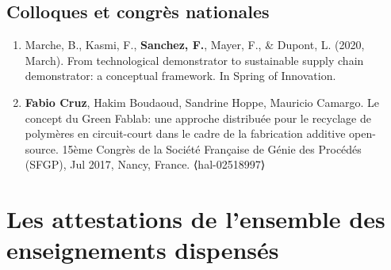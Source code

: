 \documentclass[
  12pt,
  oneside]{book}
\begin{document}
\hypertarget{colloques-et-congruxe8s-nationales}{%
\subsection{Colloques et congrès nationales}\label{colloques-et-congruxe8s-nationales}}

\begin{enumerate}
\def\labelenumi{\arabic{enumi}.}
\item
  Marche, B., Kasmi, F., \textbf{Sanchez, F.}, Mayer, F., \& Dupont, L. (2020, March). From technological demonstrator to sustainable supply chain demonstrator: a conceptual framework. In Spring of Innovation.
\item
  \textbf{Fabio Cruz}, Hakim Boudaoud, Sandrine Hoppe, Mauricio Camargo. Le concept du Green Fablab: une approche distribuée pour le recyclage de polymères en circuit-court dans le cadre de la fabrication additive open-source. 15ème Congrès de la Société Française de Génie des Procédés (SFGP), Jul 2017, Nancy, France. ⟨hal-02518997⟩
\end{enumerate}

\hypertarget{les-attestations-de-lensemble-des-enseignements-dispensuxe9s}{%
\section{Les attestations de l'ensemble des enseignements dispensés}\label{les-attestations-de-lensemble-des-enseignements-dispensuxe9s}}


\end{document}
